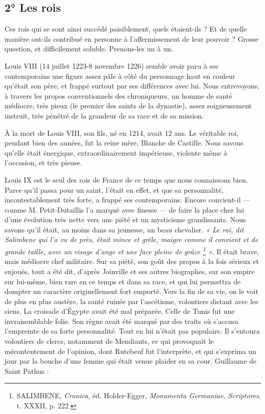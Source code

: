 \documentclass[french,twoside]{book} %
\begin{document}
\subsection[2° Les rois]{2° Les rois}
\label{c03b2}
\noindent Ces rois qui se sont ainsi succédé paisiblement, quels étaient-ils ? Et de quelle manière ont-ils contribué en personne à l’affermissement de leur pouvoir ? Grosse question, et difficilement soluble. Prenons-les un à un.\par
Louis VIII (14 juillet 1223-8 novembre 1226) semble avoir paru à ses contemporains une figure assez pâle à côté du personnage haut en couleur qu’était son père, et frappé surtout par ses différences avec lui. Nous entrevoyons, à travers les propos conventionnels des chroniqueurs, un homme de santé médiocre, très pieux (le premier des saints de la dynastie), assez soigneusement instruit, très pénétré de la grandeur de sa race et de sa mission.\par
À la mort de Louis VIII, son fils, né en 1214, avait 12 ans. Le véritable roi, pendant bien des années, fut la reine mère, Blanche de Castille. Nous savons qu’elle était énergique, extraordinairement impérieuse, violente même à l’occasion, et très pieuse.\par
Louis IX est le seul des rois de France de ce temps que nous connaissons bien. Parce qu’il passa pour un saint, l’était en effet, et que sa personnalité, incontestablement très forte, a frappé ses contemporains. Encore convient-il — comme M. Petit-Dutaillis l’a marqué avec finesse — de faire la place chez lui d’une évolution très nette vers une piété et un mysticisme grandissants. Nous savons qu’il était, au moins dans sa jeunesse, un beau chevalier. \emph{« Le roi, dit Salimbene qui l’a vu de près, était mince et grêle, maigre comme  
\label{p15} il convient et de grande taille, avec un visage d’ange et une face pleine de grâce \footnote{ SALIMBENE, {\itshape Cronica}, éd. Holder-Egger, {\itshape Monumenta Germaniae, Scriptores}, t. XXXII, p. 222.} »}. Il était brave, mais médiocre chef militaire. Sur sa piété, son goût des propos à la fois sérieux et enjoués, tout a été dit, d’après Joinville et ses autres biographes, sur son empire sur lui-même, bien rare en ce temps et dans sa race, et qui lui permettra de dompter un caractère originellement fort emporté. Vers la fin de sa vie, on le voit de plus en plus austère, la santé ruinée par l’ascétisme, volontiers distant avec les siens. La croisade d’Égypte avait été mal préparée. Celle de Tunis fut une invraisemblable folie. Son règne avait été marqué par des traits où s’accusa l’empreinte de sa forte personnalité. Tout en lui n’était pas populaire. Il s’entoura volontiers de clercs, notamment de Mendiants, ce qui provoquait le mécontentement de l’opinion, dont Rutebeuf fut l’interprète, et qui s’exprima un jour par la bouche d’une femme qui était venue plaider en sa cour. Guillaume de Saint Pathus :\par
\end{document}
